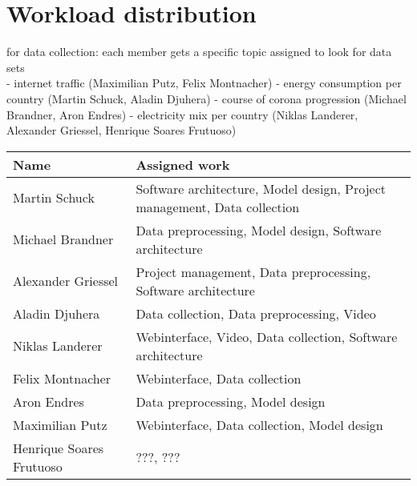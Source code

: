 \documentclass[lang=english,inputenc=utf8,fontsize=10pt]{ldvarticle}
\begin{document}
\newpage

\section{Workload distribution}

for data collection: each member gets a specific topic assigned to look for data sets \\
- internet traffic (Maximilian Putz, Felix Montnacher)
- energy consumption per country (Martin Schuck, Aladin Djuhera)
- course of corona progression (Michael Brandner, Aron Endres)
- electricity mix per country (Niklas Landerer, Alexander Griessel, Henrique Soares Frutuoso)

\begin{center}
	\begin{footnotesize}
		\setlength{\arrayrulewidth}{1,05pt}
		\begin{tabular}[htb]{|p{3cm}|p{9.1cm}|}
			\hline
			\textbf{Name} & \textbf{Assigned work} \\
			\hline
			\hline
			\rowcolor{lightgray} Martin Schuck & Software architecture, Model design, Project management, Data collection \\
			\hline
			\rowcolor{lightgray} Michael Brandner & Data preprocessing, Model design, Software architecture \\
			\hline	
			\rowcolor{lightgray} Alexander Griessel & Project management, Data preprocessing, Software architecture \\
			\hline
			\rowcolor{lightgray} Aladin Djuhera & Data collection, Data preprocessing, Video \\
			\hline
			\rowcolor{lightgray} Niklas Landerer & Webinterface, Video, Data collection, Software architecture \\
			\hline
			\rowcolor{lightgray} Felix Montnacher & Webinterface, Data collection \\
			\hline	
			\rowcolor{lightgray} Aron Endres & Data preprocessing, Model design \\
			\hline
			\rowcolor{lightgray} Maximilian Putz & Webinterface, Data collection, Model design \\
			\hline
			\rowcolor{lightgray} Henrique Soares Frutuoso & ???, ??? \\
			\hline
		\end{tabular}
	\end{footnotesize}
\end{center}

\newpage
\end{document}
